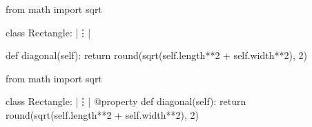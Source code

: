\documentclass[multi, border=6]{standalone}
\begin{document}
  \begin{fixedsizepythoncode}
    from math import sqrt
    
    class Rectangle:
            |\vdots|
        
        def diagonal(self):
            return round(sqrt(self.length**2 + self.width**2), 2)
  \end{fixedsizepythoncode}

  \begin{fixedsizepythoncode}
    from math import sqrt
    
    class Rectangle:
            |\vdots|
        @property
        def diagonal(self):
            return round(sqrt(self.length**2 + self.width**2), 2)
  \end{fixedsizepythoncode}
\end{document}

